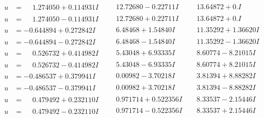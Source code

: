 \documentclass[1p]{elsarticle_modified}
\theoremstyle{definition}
\begin{document}
$$\begin{array}{c|c|c}
\begin{aligned}
u &= \phantom{-}1.274050 + 0.114931 I\end{aligned}
 & \phantom{-}12.72680 - 0.22711 I & \phantom{-}13.64872 + 0. I\phantom{ +0.000000I} \\ \hline\begin{aligned}
u &= \phantom{-}1.274050 - 0.114931 I\end{aligned}
 & \phantom{-}12.72680 + 0.22711 I & \phantom{-}13.64872 + 0. I\phantom{ +0.000000I} \\ \hline\begin{aligned}
u &= -0.644894 + 0.272842 I\end{aligned}
 & \phantom{-}6.48468 + 1.54840 I & \phantom{-}11.35292 + 1.36620 I \\ \hline\begin{aligned}
u &= -0.644894 - 0.272842 I\end{aligned}
 & \phantom{-}6.48468 - 1.54840 I & \phantom{-}11.35292 - 1.36620 I \\ \hline\begin{aligned}
u &= \phantom{-}0.526732 + 0.414982 I\end{aligned}
 & \phantom{-}5.43048 + 6.93335 I & \phantom{-}8.60774 - 8.21015 I \\ \hline\begin{aligned}
u &= \phantom{-}0.526732 - 0.414982 I\end{aligned}
 & \phantom{-}5.43048 - 6.93335 I & \phantom{-}8.60774 + 8.21015 I \\ \hline\begin{aligned}
u &= -0.486537 + 0.379941 I\end{aligned}
 & \phantom{-}0.00982 - 3.70218 I & \phantom{-}3.81394 + 8.88282 I \\ \hline\begin{aligned}
u &= -0.486537 - 0.379941 I\end{aligned}
 & \phantom{-}0.00982 + 3.70218 I & \phantom{-}3.81394 - 8.88282 I \\ \hline\begin{aligned}
u &= \phantom{-}0.479492 + 0.232110 I\end{aligned}
 & \phantom{-}0.971714 + 0.522356 I & \phantom{-}8.33537 - 2.15446 I \\ \hline\begin{aligned}
u &= \phantom{-}0.479492 - 0.232110 I\end{aligned}
 & \phantom{-}0.971714 - 0.522356 I & \phantom{-}8.33537 + 2.15446 I \\ \hline\begin{aligned}

\end{aligned}
\end{array}$$
\end{document}

